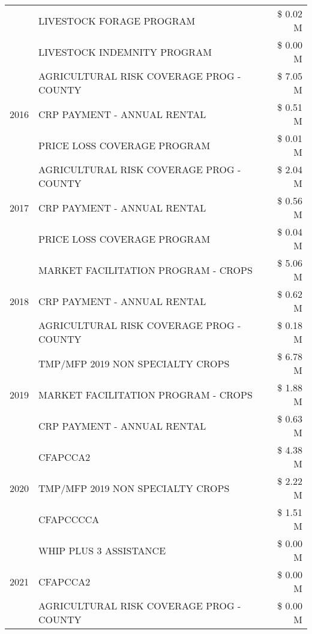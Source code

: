 \begin{tabular}{llr}
 & LIVESTOCK FORAGE PROGRAM & \$ 0.02 M \\
 & LIVESTOCK INDEMNITY PROGRAM & \$ 0.00 M \\
\cline{1-3}
\multirow[t]{3}{*}{2016} & AGRICULTURAL RISK COVERAGE PROG - COUNTY      & \$ 7.05 M \\
 & CRP PAYMENT - ANNUAL RENTAL                   & \$ 0.51 M \\
 & PRICE LOSS COVERAGE PROGRAM                   & \$ 0.01 M \\
\cline{1-3}
\multirow[t]{3}{*}{2017} & AGRICULTURAL RISK COVERAGE PROG - COUNTY & \$ 2.04 M \\
 & CRP PAYMENT - ANNUAL RENTAL & \$ 0.56 M \\
 & PRICE LOSS COVERAGE PROGRAM & \$ 0.04 M \\
\cline{1-3}
\multirow[t]{3}{*}{2018} & MARKET FACILITATION PROGRAM - CROPS & \$ 5.06 M \\
 & CRP PAYMENT - ANNUAL RENTAL & \$ 0.62 M \\
 & AGRICULTURAL RISK COVERAGE PROG - COUNTY & \$ 0.18 M \\
\cline{1-3}
\multirow[t]{3}{*}{2019} & TMP/MFP 2019 NON SPECIALTY CROPS & \$ 6.78 M \\
 & MARKET FACILITATION PROGRAM - CROPS & \$ 1.88 M \\
 & CRP PAYMENT - ANNUAL RENTAL & \$ 0.63 M \\
\cline{1-3}
\multirow[t]{3}{*}{2020} & CFAPCCA2 & \$ 4.38 M \\
 & TMP/MFP 2019 NON SPECIALTY CROPS & \$ 2.22 M \\
 & CFAPCCCCA & \$ 1.51 M \\
\cline{1-3}
\multirow[t]{3}{*}{2021} & WHIP PLUS 3 ASSISTANCE & \$ 0.00 M \\
 & CFAPCCA2 & \$ 0.00 M \\
 & AGRICULTURAL RISK COVERAGE PROG - COUNTY & \$ 0.00 M \\
\cline{1-3}
\bottomrule
\end{tabular}
